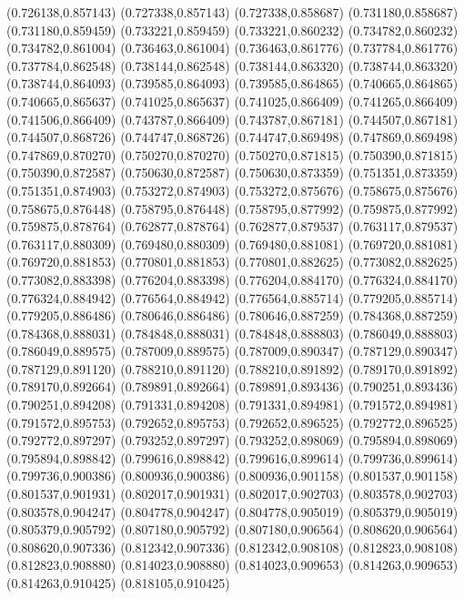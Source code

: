 (0.726138,0.857143)
(0.727338,0.857143)
(0.727338,0.858687)
(0.731180,0.858687)
(0.731180,0.859459)
(0.733221,0.859459)
(0.733221,0.860232)
(0.734782,0.860232)
(0.734782,0.861004)
(0.736463,0.861004)
(0.736463,0.861776)
(0.737784,0.861776)
(0.737784,0.862548)
(0.738144,0.862548)
(0.738144,0.863320)
(0.738744,0.863320)
(0.738744,0.864093)
(0.739585,0.864093)
(0.739585,0.864865)
(0.740665,0.864865)
(0.740665,0.865637)
(0.741025,0.865637)
(0.741025,0.866409)
(0.741265,0.866409)
(0.741506,0.866409)
(0.743787,0.866409)
(0.743787,0.867181)
(0.744507,0.867181)
(0.744507,0.868726)
(0.744747,0.868726)
(0.744747,0.869498)
(0.747869,0.869498)
(0.747869,0.870270)
(0.750270,0.870270)
(0.750270,0.871815)
(0.750390,0.871815)
(0.750390,0.872587)
(0.750630,0.872587)
(0.750630,0.873359)
(0.751351,0.873359)
(0.751351,0.874903)
(0.753272,0.874903)
(0.753272,0.875676)
(0.758675,0.875676)
(0.758675,0.876448)
(0.758795,0.876448)
(0.758795,0.877992)
(0.759875,0.877992)
(0.759875,0.878764)
(0.762877,0.878764)
(0.762877,0.879537)
(0.763117,0.879537)
(0.763117,0.880309)
(0.769480,0.880309)
(0.769480,0.881081)
(0.769720,0.881081)
(0.769720,0.881853)
(0.770801,0.881853)
(0.770801,0.882625)
(0.773082,0.882625)
(0.773082,0.883398)
(0.776204,0.883398)
(0.776204,0.884170)
(0.776324,0.884170)
(0.776324,0.884942)
(0.776564,0.884942)
(0.776564,0.885714)
(0.779205,0.885714)
(0.779205,0.886486)
(0.780646,0.886486)
(0.780646,0.887259)
(0.784368,0.887259)
(0.784368,0.888031)
(0.784848,0.888031)
(0.784848,0.888803)
(0.786049,0.888803)
(0.786049,0.889575)
(0.787009,0.889575)
(0.787009,0.890347)
(0.787129,0.890347)
(0.787129,0.891120)
(0.788210,0.891120)
(0.788210,0.891892)
(0.789170,0.891892)
(0.789170,0.892664)
(0.789891,0.892664)
(0.789891,0.893436)
(0.790251,0.893436)
(0.790251,0.894208)
(0.791331,0.894208)
(0.791331,0.894981)
(0.791572,0.894981)
(0.791572,0.895753)
(0.792652,0.895753)
(0.792652,0.896525)
(0.792772,0.896525)
(0.792772,0.897297)
(0.793252,0.897297)
(0.793252,0.898069)
(0.795894,0.898069)
(0.795894,0.898842)
(0.799616,0.898842)
(0.799616,0.899614)
(0.799736,0.899614)
(0.799736,0.900386)
(0.800936,0.900386)
(0.800936,0.901158)
(0.801537,0.901158)
(0.801537,0.901931)
(0.802017,0.901931)
(0.802017,0.902703)
(0.803578,0.902703)
(0.803578,0.904247)
(0.804778,0.904247)
(0.804778,0.905019)
(0.805379,0.905019)
(0.805379,0.905792)
(0.807180,0.905792)
(0.807180,0.906564)
(0.808620,0.906564)
(0.808620,0.907336)
(0.812342,0.907336)
(0.812342,0.908108)
(0.812823,0.908108)
(0.812823,0.908880)
(0.814023,0.908880)
(0.814023,0.909653)
(0.814263,0.909653)
(0.814263,0.910425)
(0.818105,0.910425)
